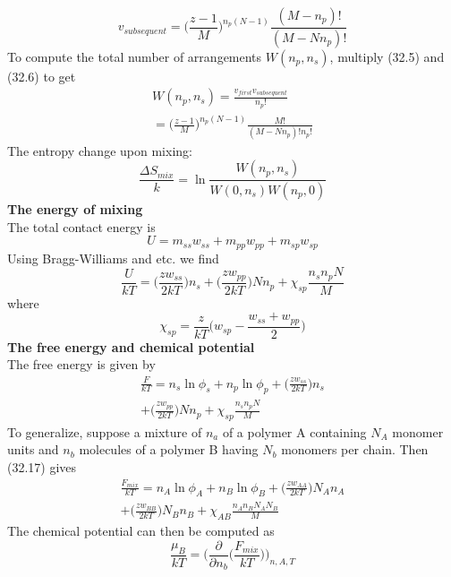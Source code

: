 \documentclass[8pt]{article}
\numberwithin{equation}{section}
\begin{document}
\begin{multicols}{2}
\begin{equation}
v_{subsequent}=\bigg(\frac{z-1}{M} \bigg)^{n_{p}(N-1)}\frac{(M-n_{p})!}{(M-Nn_{p})!} \tag{32.6}
\end{equation}
To compute the total number of arrangements $W(n_{p},n_{s})$, multiply (32.5) and (32.6) to get 
\begin{equation}\tag{32.7}
\begin{split}
W(n_{p},n_{s})=\frac{v_{first}v_{subsequent}}{n_{p}!} \\ =\bigg(\frac{z-1}{M} \bigg)^{n_{p}(N-1)}\frac{M!}{(M-Nn_{p})!n_{p}!} 
\end{split}
\end{equation}
The entropy change upon mixing:
\begin{equation}
\frac{\Delta S_{mix}}{k}=\ln{\frac{W(n_{p},n_{s})}{W(0,n_{s})W(n_{p},0)}} \tag{32.8}
\end{equation}
\textbf{The energy of mixing} \\
The total contact energy is
\begin{equation}
U=m_{ss}w_{ss}+m_{pp}w_{pp}+m_{sp}w_{sp} \tag{32.13}
\end{equation}
Using Bragg-Williams and etc. we find
\begin{equation}
\frac{U}{kT}=\bigg(\frac{zw_{ss}}{2kT} \bigg)n_{s}+\bigg(\frac{zw_{pp}}{2kT} \bigg)Nn_{p}+\chi_{sp}\frac{n_{s}n_{p}N}{M} \tag{32.15}
\end{equation}
where 
\begin{equation}
\chi_{sp}=\frac{z}{kT}\bigg(w_{sp}-\frac{w_{ss}+w_{pp}}{2} \bigg) \tag{32.16}
\end{equation}
\textbf{The free energy and chemical potential} \\
The free energy is given by 
\begin{equation}\tag{32.17}
\begin{split}
\frac{F}{kT}=n_{s}\ln{\phi_{s}}+n_{p}\ln{\phi_{p}}+\bigg(\frac{zw_{ss}}{2kT} \bigg)n_{s} \\+\bigg(\frac{zw_{pp}}{2kT} \bigg)Nn_{p}  +\chi_{sp}\frac{n_{s}n_{p}N}{M} 
\end{split}
\end{equation}
To generalize, suppose a mixture of $n_{a}$ of a polymer A containing $N_{A}$ monomer units and $n_{b}$ molecules of a polymer B having $N_{b}$ monomers per chain. Then (32.17) gives
\begin{equation}\tag{32.18}
\begin{split}
\frac{F_{mix}}{kT}=n_{A}\ln{\phi_{A}}+n_{B}\ln{\phi_{B}}+\bigg(\frac{zw_{AA}}{2kT} \bigg)N_{A}n_{A} \\+\bigg(\frac{zw_{BB}}{2kT} \bigg)N_{B}n_{B}  +\chi_{AB}\frac{n_{A}n_{B}N_{A}N_{B}}{M} 
\end{split}
\end{equation}
The chemical potential can then be computed as \begin{equation}
\frac{\mu_{B}}{kT}=\bigg(\frac{\partial}{\partial n_{b}}\bigg(\frac{F_{mix}}{kT} \bigg) \bigg)_{n,A,T} \tag{32.19}
\end{equation}
\end{multicols}
\end{document}
